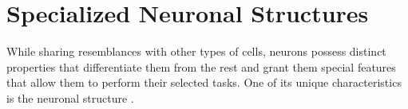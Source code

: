 \documentclass[class={myRUCProject}, crop=false]{standalone}
\begin{document}
  

\section{Specialized Neuronal Structures}
While sharing resemblances with other types of cells, neurons possess distinct properties that differentiate them from the rest and grant them special features that allow them to perform their selected tasks. One of its unique characteristics is the neuronal structure \cite{lovinger2008communication}. 
\end{document}
